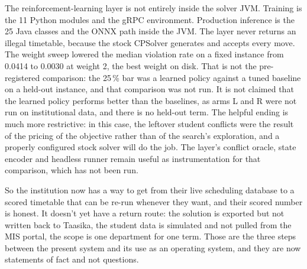 The reinforcement-learning layer is not entirely inside the solver JVM. Training is the 11 Python
modules and the gRPC environment. Production inference is the 25 Java classes and the ONNX path
inside the JVM. The layer never returns an illegal timetable, because the stock CPSolver generates
and accepts every move. The weight sweep lowered the median violation rate on a fixed instance
from 0.0414 to 0.0030 at weight 2, the best weight on disk. That is not the pre-registered
comparison: the 25\,\% bar was a learned policy against a tuned baseline on a held-out instance,
and that comparison was not run. It is not claimed that the learned policy performs better than
the baselines, as arms L and R were not run on institutional data, and there is no held-out term. The helpful ending is much more restrictive: in this case, the
leftover student conflicts were the result of the pricing of the objective rather than of the
search's exploration, and a properly configured stock solver will do the job. The layer's conflict
oracle, state encoder and headless runner remain useful as instrumentation for that comparison,
which has not been run.

So the institution now has a way to get from their live scheduling database to a scored timetable
that can be re-run whenever they want, and their scored number is honest. It doesn't yet have a
return route: the solution is exported but not written back to Taasika, the student data is
simulated and not pulled from the MIS portal, the scope is one department for one term. Those are
the three steps between the present system and its use as an operating system, and they are now
statements of fact and not questions.
